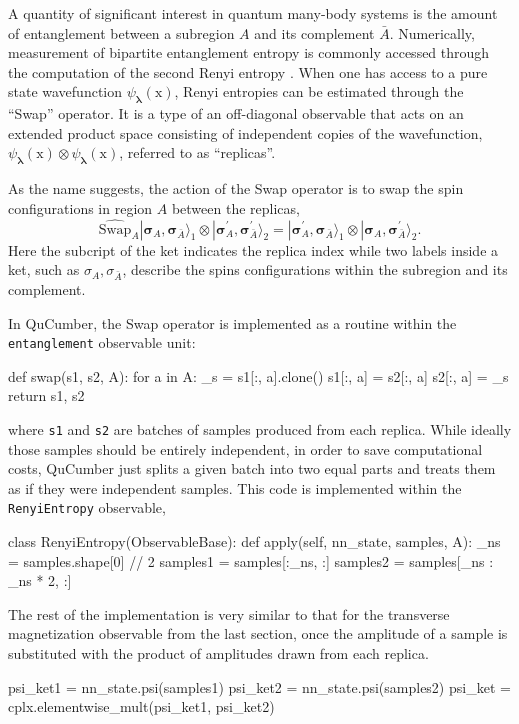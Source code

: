 \documentclass[submission, Phys, hidelnks]{SciPost}
\newcommand{\x}{\bm{\mathrm{x}}}
\begin{document}
A quantity of significant interest in quantum many-body systems is the amount of entanglement between a subregion 
$A$ and its complement $\bar{A}$.
Numerically, measurement of bipartite entanglement entropy is commonly accessed through the computation of the second Renyi entropy \cite{Swap}. 
When one has access to a pure state wavefunction $\psi_{\bm{\lambda}}(\x)$,
Renyi entropies can be estimated through the ``Swap'' operator.  It is a type of an off-diagonal observable
that acts on an extended product space consisting of independent copies of the wavefunction, $\psi_{\bm{\lambda}}(\x) \otimes \psi_{\bm{\lambda}}(\x)$, referred to as ``replicas''. 

As the name suggests, the action of the Swap operator is to swap the spin configurations in region $A$
between the replicas,
\begin{equation}
  \widehat{\textrm{Swap}}_A |\bm{\sigma}_A, \bm{\sigma}_{\bar A}\rangle_1 \otimes  |\bm{\sigma}^{\prime}_A, \bm{\sigma}^{\prime}_{\bar A}\rangle_2 = |\bm{\sigma}^{\prime}_A, \bm\sigma_{\bar A}\rangle_1 \otimes  |\bm\sigma_A, \bm\sigma^{\prime}_{\bar A}\rangle_2 .
\end{equation}
Here the subcript of the ket indicates the replica index while two labels inside a ket, such as $\sigma_A, \sigma_{\bar A}$, describe the spins configurations within the subregion and its complement. 

In QuCumber, the Swap operator is implemented as a routine within the \verb|entanglement| observable unit: 
\begin{python}
def swap(s1, s2, A):
    for a in A:
        _s = s1[:, a].clone()
        s1[:, a] = s2[:, a]
        s2[:, a] = _s
    return s1, s2
\end{python}
where \verb|s1| and \verb|s2| are batches of samples produced from each replica. While ideally those samples should be entirely independent, in order to save computational costs, QuCumber just splits a given batch into two equal parts and treats them as if they were independent samples. This code is implemented within the \verb|RenyiEntropy| observable,
\begin{python}
class RenyiEntropy(ObservableBase):
    def apply(self, nn_state, samples, A):
        _ns = samples.shape[0] // 2
        samples1 = samples[:_ns, :]
        samples2 = samples[_ns : _ns * 2, :]
\end{python}
The rest of the implementation is very similar to that for the transverse magnetization observable from the last section,
once the amplitude of a sample is substituted with the product of amplitudes drawn from each replica.
\begin{python}
psi_ket1 = nn_state.psi(samples1)
psi_ket2 = nn_state.psi(samples2)
psi_ket = cplx.elementwise_mult(psi_ket1, psi_ket2)
\end{python}
\end{document}
